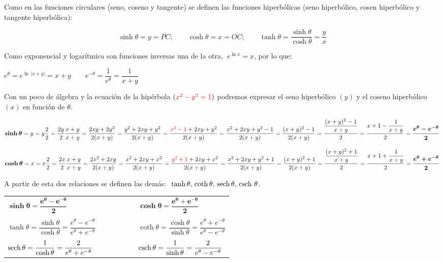 \begin{cuadro-naranja}
Como en las funciones circulares (seno, coseno y tangente) se definen las funciones hiperbólicas (seno hiperbólico, cosen hiperbólico y tangente hiperbólica):

$$\sinh \theta = y= \overline{PC};\qquad \cosh \theta=x=\overline{OC};\qquad \tanh \theta=\dfrac{\sinh \theta}{\cosh \theta}=\dfrac y x$$	
\end{cuadro-naranja}

Como exponencial y logarítmica son funciones inversas una de la otra, $\ e^{\ln x}=x$, por lo que:

$e^\theta = e^{\ln\, |x+y|}= x+y \qquad e^{-\theta}=\dfrac 1{e^\theta}= \dfrac 1{x+y}$

Con un poco de álgebra y la ecuación de la hipérbola $(\textcolor{red}{x^2-y^2=1})$ podremos expresar el seno hiperbólico $(y)$ y el coseno hiperbólico $(x)$ en función de $\theta$.

$\boldsymbol{\sinh \theta}=y=y\dfrac 2 2 = \dfrac{2y}2 \dfrac{x+y}{x+y}=\dfrac{2xy+2y^2}{2(x+y)}=\dfrac{y^2+2xy+y^2}{2(x+y)}=\dfrac{\textcolor{red}{x^2-1}+2xy+y^2}{2(x+y)}=\dfrac{x^2+2xy+y^2-1}{2(x+y)}=\dfrac{(x+y)^2-1}{2(x+y)}=\dfrac{\dfrac{(x+y)^2-1}{x+y}}{2}=\dfrac{x+1-\dfrac {1}{x+y}}{2}=\boldsymbol{\dfrac{e^\theta-e^{-\theta}}{2}}$

\vspace{3mm}
$\boldsymbol{\cosh \theta}=x=x\dfrac 2 2 = \dfrac{2x}2 \dfrac{x+y}{x+y}=\dfrac{2x^2+2xy}{2(x+y)}=\dfrac{x^2+2xy+x^2}{2(x+y)}=\dfrac{\textcolor{red}{y^2+1}+2xy+x^2}{2(x+y)}=\dfrac{x^2+2xy+y^2+1}{2(x+y)}=\dfrac{(x+y)^2+1}{2(x+y)}=\dfrac{\dfrac{(x+y)^2+1}{x+y}}{2}=\dfrac{x+1+\dfrac {1}{x+y}}{2}=\boldsymbol{\dfrac{e^\theta+e^{-\theta}}{2}}$

\vspace{2mm}
A partir de esta dos relaciones se definen las demás: $\ \tanh \theta, \, \coth \theta, \, \sech \theta,\, \csch\, \theta$. 

\vspace{10mm}


\begin{definition}

\begin{table}[H]
\centering
\begin{tabular}{lll}
$\boldsymbol{\sinh \theta=\dfrac{e^\theta-e^{-\theta}}{2}}$  & $\qquad \qquad$ & $\boldsymbol{\cosh \theta=\dfrac{e^\theta+e^{-\theta}}{2}}$ \\ \\
$\tanh \theta=\dfrac{\sinh \theta}{\cosh \theta}=\dfrac{e^\theta-e^{-\theta}}{e^\theta+e^{-\theta}}$ & & $\coth \theta=\dfrac{\cosh \theta}{\sinh \theta}=\dfrac{e^\theta+e^{-\theta}}{e^\theta-e^{-\theta}}$ \\ \\
$\sech \theta = \dfrac{1}{\cosh \theta}=\dfrac{2}{e^\theta+e^{-\theta}}$  &  & $\csch \theta = \dfrac{1}{\sinh \theta}=\dfrac{2}{e^\theta-e^{-\theta}}$
\end{tabular}
\end{table}
\end{definition}






